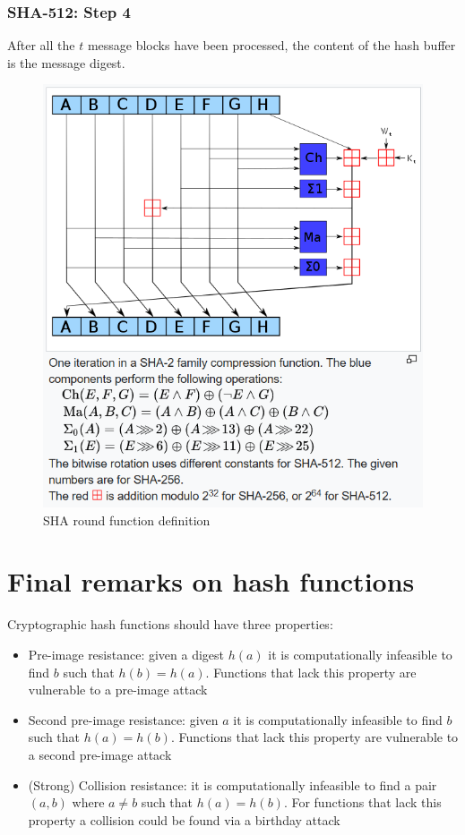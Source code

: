\subsubsection{SHA-512: Step 4}
After all the $t$ message blocks have been processed, the content of the hash buffer is the message digest.

\begin{figure}
	\centering
	\includegraphics[width=0.7\linewidth]{Images/Chapter6/sha-round-function}
	\caption{SHA round function definition}
	\label{fig:sha-round-function}
\end{figure}


\section{Final remarks on hash functions}

Cryptographic hash functions should have three properties:
\begin{itemize}
	\item Pre-image resistance: given a digest $h(a)$ it is computationally infeasible to find $b$ such that $h(b) = h(a)$. Functions that lack this property are vulnerable to a pre-image attack
	\item Second pre-image resistance: given $a$ it is computationally infeasible to find $b$ such that $h(a) = h(b)$. Functions that lack this property are vulnerable to a second pre-image attack
	\item (Strong) Collision resistance: it is computationally infeasible to find a pair $(a,b)$ where $a \neq b$ such that $h(a) = h(b)$. For functions that lack this property a collision could be found via a birthday attack
\end{itemize}

